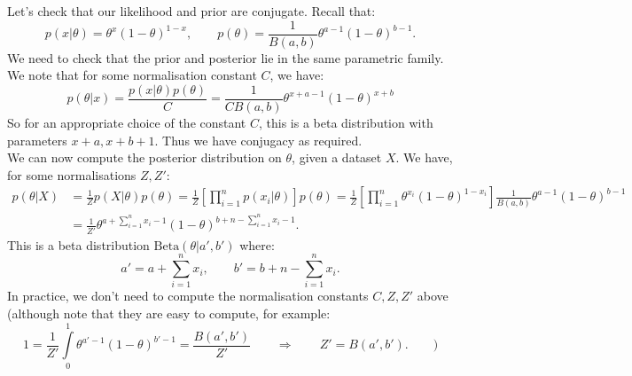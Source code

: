 \begin{frameex}
Let's check that our likelihood and prior are conjugate. Recall that:
\begin{equation*}
p(x | \theta) = \theta^x (1 - \theta)^{1-x}, \qquad p(\theta) = \frac{1}{B(a,b)} \theta^{a-1} (1-\theta)^{b-1}.
\end{equation*}
We need to check that the prior and posterior lie in the same parametric family. We note that for some normalisation constant $C$, we have:
\begin{equation*}
p(\theta | x) = \frac{p(x | \theta) p(\theta)}{C} = \frac{1}{C B(a,b)} \theta^{x + a-1} (1-\theta)^{x + b}
\end{equation*}
So for an appropriate choice of the constant $C$, this is a beta distribution with parameters $x+a, x+b+1$. Thus we have conjugacy as required.\\

We can now compute the posterior distribution on $\theta$, given a dataset $X$. We have, for some normalisations $Z, Z'$:
\begin{align*}
p(\theta | X) &= \frac{1}{Z} p(X|\theta) p(\theta) = \frac{1}{Z} \left[ \prod_{i=1}^{n} p(x_i | \theta) \right] p(\theta) = \frac{1}{Z} \left[ \prod_{i=1}^{n} \theta^{x_i} (1 - \theta)^{1 - x_i} \right] \frac{1}{B(a,b)} \theta^{a -1} (1 - \theta)^{b-1} \\[1.5ex]
&= \frac{1}{Z'} \theta^{a + \sum_{i=1}^{n} x_i - 1} (1 - \theta)^{b + n - \sum_{i=1}^{n} x_i - 1}.
\end{align*}
This is a beta distribution $\textrm{Beta}(\theta | a', b')$ where:
\begin{equation*}
a' = a + \sum_{i=1}^{n} x_i, \qquad b' = b + n - \sum_{i=1}^{n} x_i.
\end{equation*}
In practice, we don't need to compute the normalisation constants $C, Z, Z'$ above (although note that they are easy to compute, for example:
\begin{equation*}
1 = \frac{1}{Z'} \int\limits_{0}^{1} \theta^{a' - 1} (1 - \theta)^{b' - 1} = \frac{B(a', b')}{Z'} \qquad \Rightarrow \qquad Z' = B(a',b'). \qquad )
\end{equation*}
\end{frameex}



\newpage

